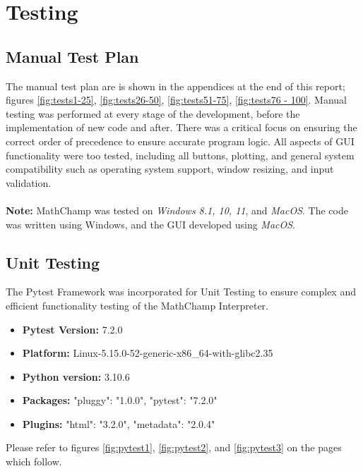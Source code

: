 \documentclass[a4paper, oneside, 11pt]{report}
\begin{document}
\newpage

\chapter{Testing}\label{Testing}
\section{Manual Test Plan}
The manual test plan are is shown in the appendices at the end of this report; figures \ref{fig:tests1-25}, \ref{fig:tests26-50}, \ref{fig:tests51-75}, \ref{fig:tests76 - 100}. Manual testing was performed at every stage of the development, before the implementation of new code and after. There was a critical focus on ensuring the correct order of precedence to ensure accurate program logic. All aspects of GUI functionality were too tested, including all buttons, plotting, and general system compatibility such as operating system support, window resizing, and input validation.\\\\
\textbf{Note:} MathChamp was tested on \emph{Windows 8.1, 10, 11}, and \emph{MacOS}. The code was written using Windows, and the GUI developed using \emph{MacOS}.


\section{Unit Testing}
The Pytest Framework was incorporated for Unit Testing to ensure complex and efficient functionality testing of the MathChamp Interpreter.

\begin{itemize}
    \item \textbf {Pytest Version:} 7.2.0
    \item \textbf {Platform:} Linux-5.15.0-52-generic-x86\_64-with-glibc2.35
    \item \textbf {Python version:}	3.10.6
    \item \textbf {Packages:} "pluggy": "1.0.0", "pytest": "7.2.0"
    \item \textbf {Plugins:} "html": "3.2.0", "metadata": "2.0.4"
\end{itemize}

Please refer to figures \ref{fig:pytest1}, \ref{fig:pytest2}, and \ref{fig:pytest3} on the pages which follow.
\end{document}

